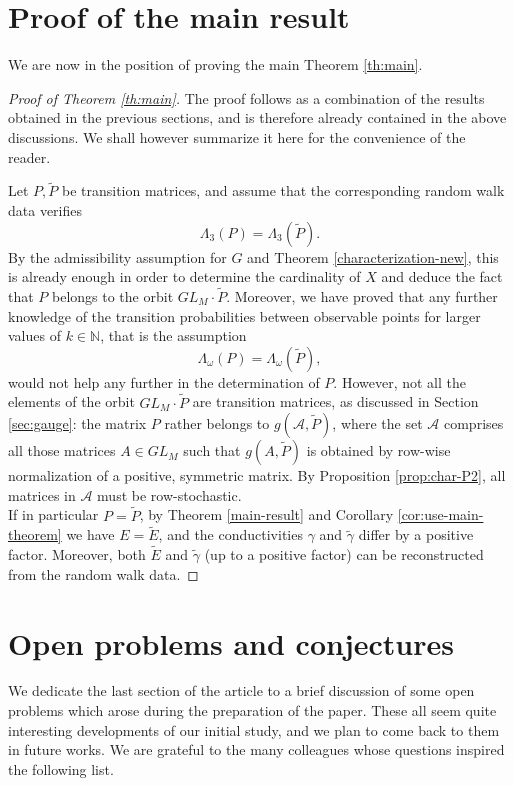 \documentclass[a4paper,11pt,oneside]{amsart}
\newcommand{\N}{{\mathbb N}}
\begin{document}
\section{Proof of the main result}

We are now in the position of proving the main Theorem \ref{th:main}.

\begin{proof}[Proof of Theorem \ref{th:main}]
    The proof follows as a combination of the results obtained in the previous sections, and is therefore already contained in the above discussions. We shall however summarize it here for the convenience of the reader. 
    
    Let $P,\tilde P$ be transition matrices, and assume that the corresponding random walk data verifies
 $$ \Lambda_3(P)=\Lambda_3(\tilde P). $$   
    By the admissibility assumption for $G$ and Theorem \ref{characterization-new}, this is already enough in order to determine the cardinality of $X$ and deduce the fact that $P$ belongs to the orbit $GL_M\cdot\tilde P$. Moreover, we have proved that any further knowledge of the transition probabilities between observable points for larger values of $k\in\N$, that is the assumption $$ \Lambda_\omega(P)=\Lambda_\omega(\tilde P), $$ would not help any further in the determination of $P$. However, not all the elements of the orbit $GL_M\cdot\tilde P$ are transition matrices, as discussed in Section \ref{sec:gauge}: the matrix $P$ rather belongs to $g(\mathcal A, \tilde P)$, where the set $\mathcal A$ comprises all those matrices $A\in GL_M$ such that $g(A,\tilde P)$ is obtained by row-wise normalization of a positive, symmetric matrix. By Proposition \ref{prop:char-P2}, all matrices in $\mathcal A$ must be row-stochastic. \\ 
    If in particular $P=\tilde P$, by Theorem \ref{main-result} and Corollary \ref{cor:use-main-theorem} we have $E=\tilde E$, and the conductivities $\gamma$ and $\tilde \gamma$ differ by a positive factor. Moreover, both $\tilde E$ and $\tilde \gamma$ (up to a positive factor) can be reconstructed from the random walk data.
\end{proof}



\section{Open problems and conjectures}\label{sec:open-problems}

We dedicate the last section of the article to a brief discussion of some open problems which arose during the preparation of the paper. These all seem quite interesting developments of our initial study, and we plan to come back to them in future works. We are grateful to the many colleagues whose questions inspired the following list. \\
\end{document}
